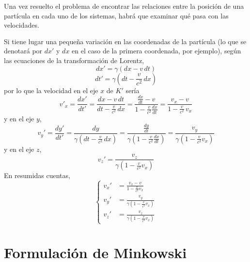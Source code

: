 \documentclass[12pt]{report}
\begin{document}
\vspace{2mm}
Una vez resuelto el problema de encontrar las relaciones entre la posición de una partícula en cada uno de los sistemas, habrá que examinar qué pasa con las velocidades. 

\vspace{2mm}
Si tiene lugar una pequeña variación en las coordenadas de la partícula (lo que se denotará por $dx'$ y $dx$ en el caso de la primera coordenada, por ejemplo), según las ecuaciones de la transformación de Lorentz,
\[dx' = \gamma (dx - v \, dt)\]
\[dt' = \gamma (dt - \frac{v}{c^2} \, dx)\]
por lo que la velocidad en el eje $x$ de $K'$ sería
\[v'_x = \frac{dx'}{dt'} = \frac{dx-v \, dt}{dt - \frac{v}{c^2} \, dx} = \frac{\frac{dx}{dt} - v}{1 - \frac{v}{c^2}\frac{dx}{dt}} = \frac{v_x - v}{1-\frac{v}{c^2} \, v_x}\]
y en el eje $y$,
\[v_y' = \frac{dy'}{dt'} = \frac{dy}{\gamma(dt-\frac{v}{c^2} \, dx)} = \frac{\frac{dy}{dt}}{\gamma(1-\frac{v}{c^2}\frac{dx}{dt})} = \frac{v_y}{\gamma (1-\frac{v}{c^2}v_x)}\]
y en el eje $z$,
\[v_z' =  \frac{v_z}{\gamma (1-\frac{v}{c^2}v_x)}\]
En resumidas cuentas,
\[
\left\{
\begin{aligned}
    v_x' &= \frac{v_x-v}{1-\frac{v}{c^2}v_x} \\[5pt]
    v_y' &= \frac{v_y}{\gamma(1-\frac{v}{c^2}v_x)} \\[5pt]
    v_z' &= \frac{v_z}{\gamma(1-\frac{v}{c^2}v_x)}
\end{aligned}
\right.
\]

\section{Formulación de Minkowski}
\end{document}
